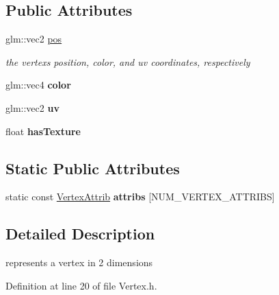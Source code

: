 \subsection*{Public Attributes}
\begin{DoxyCompactItemize}
\item 
\mbox{\label{structnta_1_1Vertex2D_a27a44e1ca52b5a5a13d37495e9376636}} 
glm\+::vec2 \hyperlink{structnta_1_1Vertex2D_a27a44e1ca52b5a5a13d37495e9376636}{pos}
\begin{DoxyCompactList}\small\item\em the vertex\textquotesingle{}s position, color, and uv coordinates, respectively \end{DoxyCompactList}\item 
\mbox{\label{structnta_1_1Vertex2D_a05016aff7572c60a2cb688e67b2a4a31}} 
glm\+::vec4 {\bfseries color}
\item 
\mbox{\label{structnta_1_1Vertex2D_a71707b6c29cae0e883e76042e27e84d5}} 
glm\+::vec2 {\bfseries uv}
\item 
\mbox{\label{structnta_1_1Vertex2D_ac1b1fb722a89abaee9cddfb59543af85}} 
float {\bfseries has\+Texture}
\end{DoxyCompactItemize}
\subsection*{Static Public Attributes}
\begin{DoxyCompactItemize}
\item 
static const \hyperlink{namespacenta_df/d9d/structnta_1_1VertexAttrib}{Vertex\+Attrib} {\bfseries attribs} \mbox{[}N\+U\+M\+\_\+\+V\+E\+R\+T\+E\+X\+\_\+\+A\+T\+T\+R\+I\+BS\mbox{]}
\end{DoxyCompactItemize}


\subsection{Detailed Description}
represents a vertex in 2 dimensions 

Definition at line 20 of file Vertex.\+h.



